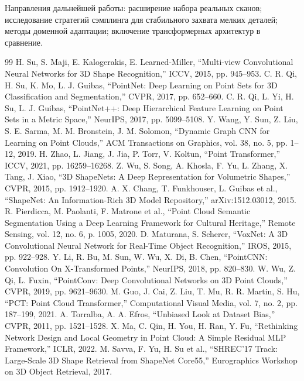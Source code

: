 \documentclass{misisarticle}
\begin{document}
Направления дальнейшей работы: расширение набора реальных сканов; исследование стратегий сэмплинга для стабильного захвата мелких деталей; методы доменной адаптации; включение трансформерных архитектур в сравнение.

\begin{thebibliography}{99}
 H. Su, S. Maji, E. Kalogerakis, E. Learned-Miller, ``Multi-view Convolutional Neural Networks for 3D Shape Recognition,'' ICCV, 2015, pp. 945--953.
 C. R. Qi, H. Su, K. Mo, L. J. Guibas, ``PointNet: Deep Learning on Point Sets for 3D Classification and Segmentation,'' CVPR, 2017, pp. 652--660.
 C. R. Qi, L. Yi, H. Su, L. J. Guibas, ``PointNet++: Deep Hierarchical Feature Learning on Point Sets in a Metric Space,'' NeurIPS, 2017, pp. 5099--5108.
 Y. Wang, Y. Sun, Z. Liu, S. E. Sarma, M. M. Bronstein, J. M. Solomon, ``Dynamic Graph CNN for Learning on Point Clouds,'' ACM Transactions on Graphics, vol. 38, no. 5, pp. 1--12, 2019.
 H. Zhao, L. Jiang, J. Jia, P. Torr, V. Koltun, ``Point Transformer,'' ICCV, 2021, pp. 16259--16268.
 Z. Wu, S. Song, A. Khosla, F. Yu, L. Zhang, X. Tang, J. Xiao, ``3D ShapeNets: A Deep Representation for Volumetric Shapes,'' CVPR, 2015, pp. 1912--1920.
 A. X. Chang, T. Funkhouser, L. Guibas et al., ``ShapeNet: An Information-Rich 3D Model Repository,'' arXiv:1512.03012, 2015.
 R. Pierdicca, M. Paolanti, F. Matrone et al., ``Point Cloud Semantic Segmentation Using a Deep Learning Framework for Cultural Heritage,'' Remote Sensing, vol. 12, no. 6, p. 1005, 2020.
 D. Maturana, S. Scherer, ``VoxNet: A 3D Convolutional Neural Network for Real-Time Object Recognition,'' IROS, 2015, pp. 922--928.
 Y. Li, R. Bu, M. Sun, W. Wu, X. Di, B. Chen, ``PointCNN: Convolution On X-Transformed Points,'' NeurIPS, 2018, pp. 820--830.
 W. Wu, Z. Qi, L. Fuxin, ``PointConv: Deep Convolutional Networks on 3D Point Clouds,'' CVPR, 2019, pp. 9621--9630.
 M. Guo, J. Cai, Z. Liu, T. Mu, R. R. Martin, S. Hu, ``PCT: Point Cloud Transformer,'' Computational Visual Media, vol. 7, no. 2, pp. 187--199, 2021.
 A. Torralba, A. A. Efros, ``Unbiased Look at Dataset Bias,'' CVPR, 2011, pp. 1521--1528.
 X. Ma, C. Qin, H. You, H. Ran, Y. Fu, ``Rethinking Network Design and Local Geometry in Point Cloud: A Simple Residual MLP Framework,'' ICLR, 2022.
 M. Savva, F. Yu, H. Su et al., ``SHREC'17 Track: Large-Scale 3D Shape Retrieval from ShapeNet Core55,'' Eurographics Workshop on 3D Object Retrieval, 2017.

\end{thebibliography}
\end{document}
